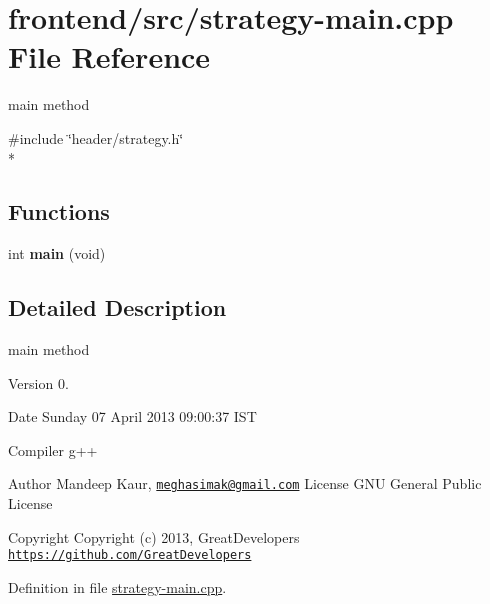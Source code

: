 \hypertarget{strategy-main_8cpp}{\section{frontend/src/strategy-\/main.cpp File Reference}
\label{strategy-main_8cpp}
}


main method  


{\ttfamily \#include \char`\"{}header/strategy.\-h\char`\"{}}\\*
\subsection*{Functions}
\begin{DoxyCompactItemize}
\item 
\hypertarget{strategy-main_8cpp_a840291bc02cba5474a4cb46a9b9566fe}{int {\bfseries main} (void)}\label{strategy-main_8cpp_a840291bc02cba5474a4cb46a9b9566fe}

\end{DoxyCompactItemize}


\subsection{Detailed Description}
main method \begin{DoxyVersion}{Version}
0. 
\end{DoxyVersion}
\begin{DoxyDate}{Date}
Sunday 07 April 2013 09\-:00\-:37 I\-S\-T\par
 Compiler g++
\end{DoxyDate}
\begin{DoxyAuthor}{Author}
Mandeep Kaur, \href{mailto:meghasimak@gmail.com}{\tt meghasimak@gmail.\-com} License G\-N\-U General Public License 
\end{DoxyAuthor}
\begin{DoxyCopyright}{Copyright}
Copyright (c) 2013, Great\-Developers \href{https://github.com/GreatDevelopers}{\tt https\-://github.\-com/\-Great\-Developers} 
\end{DoxyCopyright}


Definition in file \hyperlink{strategy-main_8cpp_source}{strategy-\/main.\-cpp}.

